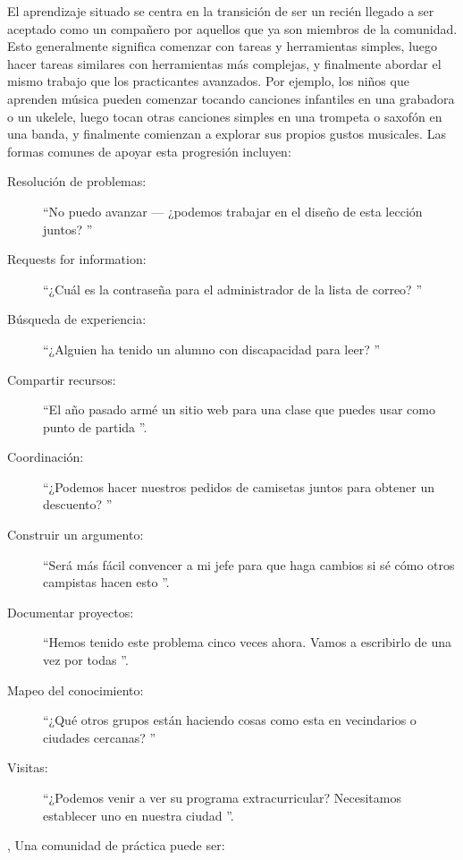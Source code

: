 El aprendizaje situado se centra en la transición de ser un recién llegado
a ser aceptado como un compañero por aquellos que ya son miembros de la comunidad.
Esto generalmente significa comenzar con tareas y herramientas simples,
luego hacer tareas similares con herramientas más complejas,
y finalmente abordar el mismo trabajo que los practicantes avanzados.
Por ejemplo,
los niños que aprenden música pueden comenzar tocando canciones infantiles en una grabadora o un ukelele,
luego tocan otras canciones simples en una trompeta o saxofón en una banda,
y finalmente comienzan a explorar sus propios gustos musicales.
Las formas comunes de apoyar esta progresión incluyen:

\newpage
\begin{description}

\item[Resolución de problemas:]
  ``No puedo avanzar --- ¿podemos trabajar en el diseño de esta lección juntos? ''
\item[Requests for information:]
  ``¿Cuál es la contraseña para el administrador de la lista de correo? ''
\item[Búsqueda de experiencia:]
  ``¿Alguien ha tenido un alumno con discapacidad para leer? ''
\item[Compartir recursos:]
  ``El año pasado armé un sitio web para una clase que puedes usar como punto de partida ''.
\item[Coordinación:]
  ``¿Podemos hacer nuestros pedidos de camisetas juntos para obtener un descuento? ''
\item[Construir un argumento:]
  ``Será más fácil convencer a mi jefe para que haga cambios si sé cómo otros campistas hacen esto ''.
\item[Documentar proyectos:]
  ``Hemos tenido este problema cinco veces ahora. Vamos a escribirlo de una vez por todas ''.
\item[Mapeo del conocimiento:]
  ``¿Qué otros grupos están haciendo cosas como esta en vecindarios o ciudades cercanas? ''
\item[Visitas:]
  ``¿Podemos venir a ver su programa extracurricular? Necesitamos establecer uno en nuestra ciudad ''.
\end{description}

,
Una comunidad de práctica puede ser:

